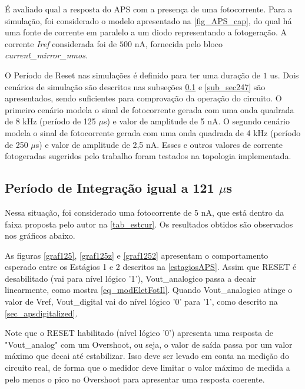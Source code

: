 É avaliado qual a resposta do APS com a presença de uma fotocorrente. Para a simulação, foi considerado o modelo apresentado na \autoref{fig_APS_cap}, do qual há uma fonte de corrente em paralelo a um diodo representando a fotogeração. A corrente \textit{Iref} considerada foi de $500$ nA, fornecida pelo bloco \textit{current\_mirror\_nmos}.

O Período de Reset nas simulações é definido para ter uma duração de $1$ us. Dois cenários de simulação são descritos nas subseções \ref{sub_sec121} e \ref{sub_sec247} são apresentados, sendo suficientes para comprovação da operação do circuito. O primeiro cenário modela o sinal de fotocorrente gerada com uma onda quadrada de 8 kHz (período de 125 $\mu$s) e valor de amplitude de 5 nA. O segundo cenário modela o sinal de fotocorrente gerada com uma onda quadrada de 4 kHz (período de 250 $\mu$s) e valor de amplitude de 2,5 nA. Esses e outros valores de corrente fotogeradas sugeridos pelo trabalho \cite{LidianeCampos} foram testados na topologia implementada.

\subsection{Período de Integração igual a 121 $\mu$s}
\label{sub_sec121}

Nessa situação, foi considerado uma fotocorrente de 5 nA, que está dentro da faixa proposta pelo autor na \autoref{tab_estcur}. Os resultados obtidos são observados nos gráficos abaixo.

As figuras \ref{graf125}, \ref{graf125z} e \ref{graf1252} apresentam o comportamento esperado entre os Estágios 1 e 2 descritos na \autoref{estagiosAPS}. Assim que RESET é desabilitado (vai para nível lógico '1'), Vout\_analogico passa a decair linearmente, como mostra \autoref{eq_modEletFotIl}. Quando Vout\_analogico atinge o valor de Vref, Vout\_digital vai do nível lógico '0' para '1', como descrito na \autoref{sec_apsdigitalized}.

Note que o RESET habilitado (nível lógico '0') apresenta uma resposta de "Vout\_analog" com um Overshoot, ou seja, o valor de saída passa por um valor máximo que decai até estabilizar. Isso deve ser levado em conta na medição do circuito real, de forma que o medidor deve limitar o valor máximo de medida a pelo menos o pico no Overshoot para apresentar uma resposta coerente.


